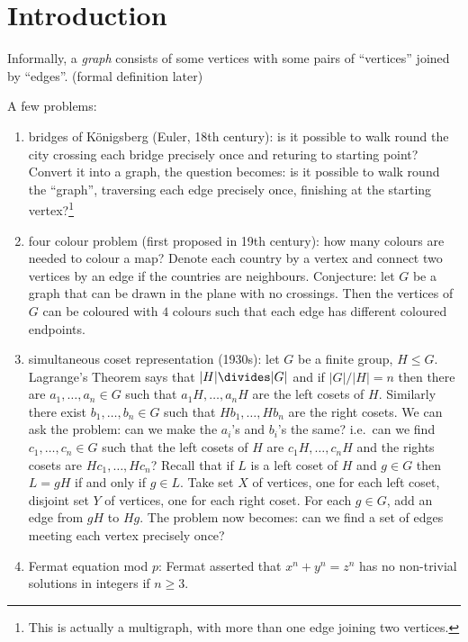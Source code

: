 \documentclass[a4paper]{article}
\begin{document}


\tableofcontents

\setcounter{section}{-1}

\section{Introduction}

Informally, a \emph{graph} consists of some vertices with some pairs of ``vertices'' joined by ``edges''. (formal definition later)

A few problems:
\begin{enumerate}
\item bridges of Königsberg (Euler, 18th century): is it possible to walk round the city crossing each bridge precisely once and returing to starting point? Convert it into a graph, the question becomes: is it possible to walk round the ``graph'', traversing each edge precisely once, finishing at the starting vertex?\footnote{This is actually a multigraph, with more than one edge joining two vertices.}
\item four colour problem (first proposed in 19th century): how many colours are needed to colour a map? Denote each country by a vertex and connect two vertices by an edge if the countries are neighbours. Conjecture: let \(G\) be a graph that can be drawn in the plane with no crossings. Then the vertices of \(G\) can be coloured with \(4\) colours such that each edge has different coloured endpoints.
\item simultaneous coset representation (1930s): let \(G\) be a finite group, \(H \leq G\). Lagrange's Theorem says that \(|H| \divides |G|\) and if \(|G|/|H| = n\) then there are \(a_1, \dots, a_n \in G\) such that \(a_1H, \dots, a_nH\) are the left cosets of \(H\). Similarly there exist \(b_1, \dots, b_n \in G\) such that \(Hb_1, \dots, Hb_n\) are the right cosets. We can ask the problem: can we make the \(a_i\)'s and \(b_i\)'s the same? i.e.\ can we find \(c_1, \dots, c_n \in G\) such that the left cosets of \(H\) are \(c_1H, \dots, c_nH\) and the rights cosets are \(Hc_1, \dots, Hc_n\)? Recall that if \(L\) is a left coset of \(H\) and \(g \in G\) then \(L = gH\) if and only if \(g \in L\). Take set \(X\) of vertices, one for each left coset, disjoint set \(Y\) of vertices, one for each right coset. For each \(g \in G\), add an edge from \(gH\) to \(Hg\). The problem now becomes: can we find a set of edges meeting each vertex precisely once?
\item Fermat equation mod \(p\): Fermat asserted that \(x^n + y^n = z^n\) has no non-trivial solutions in integers if \(n \geq 3\). 


\end{enumerate}
\end{document}
